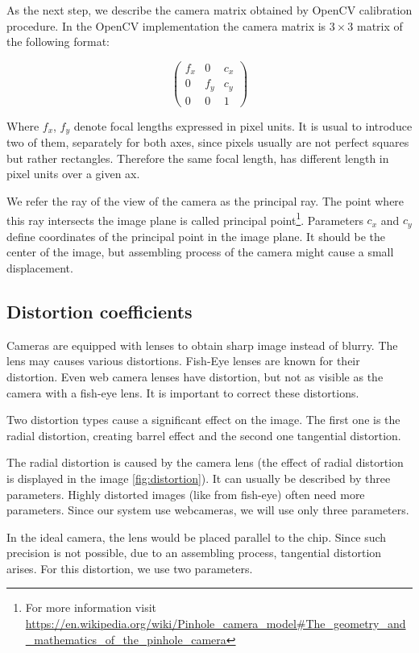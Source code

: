 As the next step, we describe the camera matrix obtained by OpenCV calibration
procedure. In the OpenCV implementation the camera matrix is $3\times3$ matrix of the
following format:

\[
\begin{pmatrix}
	f_x 	& 0 	& c_x \\
	0	& f_y	& c_y \\
	0	& 0	& 1
\end{pmatrix}
\]

Where $f_x$, $f_y$ denote focal lengths expressed in pixel units. It is usual
to introduce two of them, separately for both axes, since pixels usually are
not perfect squares but rather rectangles. Therefore the same focal length, has
different length in pixel units over a given ax.

We refer the ray of the view of the camera as the principal ray. The point
where this ray intersects the image plane is called principal
point\footnote{For more information visit \url{https://en.wikipedia.org/wiki/Pinhole\_camera\_model\#The\_geometry\_and\_mathematics\_of\_the\_pinhole\_camera}}.
Parameters $c_x$ and $c_y$ define coordinates of the principal point in the
image plane.  It should be the center of the image, but assembling process of
the camera might cause a small displacement.

\subsection{Distortion coefficients}

Cameras are equipped with lenses to obtain sharp image instead of blurry. The
lens may causes various distortions. Fish-Eye lenses are known for their
distortion.  Even web camera lenses have distortion, but not as visible as the
camera with a fish-eye lens. It is important to correct these distortions.

Two distortion types cause a significant effect on the image. The first one is
the radial distortion, creating barrel effect and the second one tangential distortion.

The radial distortion is caused by the camera lens (the effect of radial
distortion is displayed in the image \ref{fig:distortion}). It can usually be
described by three parameters. Highly distorted images (like from fish-eye)
often need more parameters. Since our system use webcameras, we will use only
three parameters.

In the ideal camera, the lens would be placed parallel to the chip. Since such
precision is not possible, due to an assembling process, tangential distortion
arises. For this distortion, we use two parameters.

